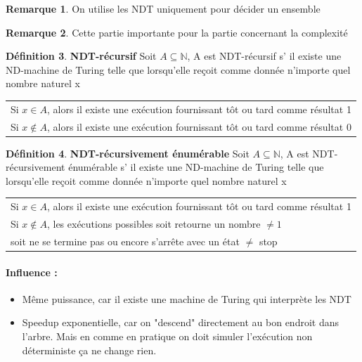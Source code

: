 \documentclass[11pt,a4paper]{article}
\newcommand{\N}{\mathbb{N}}
\theoremstyle{definition}
\newtheorem{mydef}{Définition}
\newtheorem{myrem}[mydef]{Remarque}
\begin{document}
\begin{myrem}
	On utilise les NDT uniquement pour décider un ensemble
\end{myrem}

\begin{myrem}
	Cette partie importante pour la partie concernant la complexité
\end{myrem}

\begin{mydef}
	\textbf{NDT-récursif} Soit $A\subseteq \N$, A est NDT-récursif s’ il 
	existe une ND-machine de Turing telle que lorsqu'elle reçoit comme 
	donnée n'importe quel nombre naturel x\\
	\begin{tabular}{l}
		Si $x\in A$, alors il existe une exécution fournissant tôt ou 
		tard comme résultat 1\\
		Si $x\notin A$, alors il existe une exécution fournissant tôt ou 
		tard comme résultat 0\\
	\end{tabular}
\end{mydef}

\begin{mydef}
	\textbf{NDT-récursivement énumérable} Soit $A\subseteq \N$, A est 
	NDT-récursivement énumérable s’ il 
	existe une ND-machine de Turing telle que lorsqu'elle reçoit comme 
	donnée n'importe quel nombre naturel x\\
	\begin{tabular}{l}
		Si $x\in A$, alors il existe une exécution fournissant tôt ou 
		tard comme résultat 1\\
		Si $x\notin A$, les exécutions possibles soit retourne un 
		nombre $\neq 1$ \\
		soit ne se termine pas ou encore s'arrête avec 
		un état $\neq$ stop\\
	\end{tabular}
\end{mydef}

\paragraph{Influence :} 
\begin{itemize}
	\item Même puissance, car il existe une machine de Turing qui interprète
	 les NDT 
	\item Speedup exponentielle, car on "descend" directement au bon endroit 
		dans l'arbre. Mais en comme en pratique on doit simuler 
		l'exécution non déterministe ça ne change rien.
\end{itemize}
\end{document}
